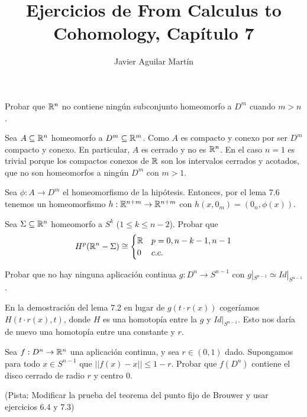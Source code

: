 \documentclass[twoside]{article}
\begin{document}
\title{Ejercicios de From Calculus to Cohomology, Capítulo 7}
\author{Javier Aguilar Martín}
\maketitle


\begin{ejercicio}{7.1}
 Probar que $\mathbb{R}^n$ no contiene ningún subconjunto homeomorfo a $D^m$ cuando $m>n$.
\end{ejercicio}
\begin{solucion}
Sea $A\subseteq \mathbb{R}^n$ homeomorfo a $D^m\subseteq\mathbb{R}^m$. Como $A$ es compacto y conexo por ser $D^m$ compacto y conexo. En particular, $A$ es cerrado y no es $\mathbb{R}^n$. En el caso $n=1$ es trivial porque los compactos conexos de $\mathbb{R}$ son los intervalos cerrados y acotados, que no son homeomorfos a ningún $D^m$ con $m>1$.

Sea $\phi:A\to D^m$ el homeomorfismo de la hipótesis. Entonces, por el lema 7.6 tenemos un homeomorfismo $h:\mathbb{R}^{n+m}\to\mathbb{R}^{n+m}$ con $h(x,0_m)=(0_n,\phi(x))$. 


\end{solucion}

\newpage

\begin{ejercicio}{7.2}
Sea $\Sigma\subseteq\mathbb{R}^n$ homeomorfo a $S^k$ ($1\leq k\leq n-2$). Probar que
\[
H^p(\mathbb{R}^n-\Sigma)\cong\begin{cases}
\mathbb{R}& p=0,n-k-1,n-1\\
0 & c.c.
\end{cases}
\]
\end{ejercicio}
\begin{solucion}

\end{solucion}
\newpage

\begin{ejercicio}{7.3}
Probar que no hay ninguna aplicación continua $g:D^n\to S^{n-1}$ con $g|_{S^{n-1}}\simeq Id|_{S^{n-1}}$.
\end{ejercicio}
\begin{solucion}
En la demostración del lema 7.2 en lugar de $g(t\cdot r(x))$ cogeríamos $H(t\cdot r(x), t)$, donde $H$ es una homotopía entre la $g$ y $Id|_{S^{n-1}}$. Esto nos daría de nuevo una homotopía entre una constante y $r$.
\end{solucion}
\newpage

\begin{ejercicio}{7.4}
Sea $f:D^n\to\mathbb{R}^n$ una aplicación continua, y sea $r\in(0,1)$ dado. Supongamos para todo $x\in S^{n-1}$ que $||f(x)-x||\leq 1-r$. Probar que $f(D^n)$ contiene el disco cerrado de radio $r$ y centro 0.

(Pista: Modificar la prueba del teorema del punto fijo de Brouwer y usar ejercicios 6.4 y 7.3)
\end{ejercicio}
\begin{solucion}

\end{solucion}
\end{document}
